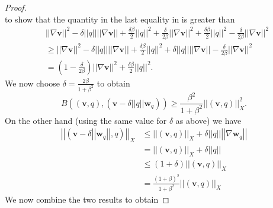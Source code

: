 \documentclass[12pt,a4paper]{article}
\theoremstyle{definition}
\begin{document}
\begin{proof}
\begin{equation}
\end{equation}
to show that the quantity in the last equality in is greater than
\begin{equation}
\begin{aligned}\nonumber
&\left|\left|\nabla \textbf{v}\right|\right|^2 -  \delta\left|\left|q\right|\right|\left|\left|\nabla \textbf{v}\right|\right| +\frac{\delta \beta }{2}\left|\left|q\right|\right|^2 + \frac{\delta}{2\beta}\left|\left|\nabla\textbf{v}\right|\right|^2 +\frac{\delta \beta }{2}\left|\left|q\right|\right|^2 - \frac{\delta}{2\beta}\left|\left|\nabla\textbf{v}\right|\right|^2\\
&\geq \left|\left|\nabla \textbf{v}\right|\right|^2 -  \delta\left|\left|q\right|\right|\left|\left|\nabla \textbf{v}\right|\right| +\frac{\delta \beta }{2}\left|\left|q\right|\right|^2 + \delta\left|\left|q\right|\right|\left|\left|\nabla \textbf{v}\right|\right|- \frac{\delta}{2\beta}\left|\left|\nabla\textbf{v}\right|\right|^2\\
&=\left(1-\frac{\delta}{2\beta}\right)\left|\left|\nabla \textbf{v}\right|\right|^2 +\frac{\delta\beta}{2}\left|\left|q\right|\right|^2.
\end{aligned}
\end{equation}
We now choose $\delta=\frac{2\beta}{1+\beta^2}$ to obtain
\begin{equation}\nonumber
B\left(\left(\textbf{v},q\right),\left(\textbf{v}-\delta\left|\left|q\right|\right|\textbf{w}_q\right)\right)\geq \frac{\beta^2}{1+\beta^2}\left|\left|\left(\textbf{v},q\right)\right|\right|_X^2.
\end{equation}
On the other hand (using the same value for $\delta$ as above) we have
\begin{equation}
\begin{aligned}\nonumber
\left|\left|\left(\textbf{v}-\delta\left|\left|\textbf{w}_q\right|\right|,q\right)\right|\right|_X&\leq \left|\left|\left(\textbf{v},q\right)\right|\right|_X+\delta\left|\left|q\right|\right|\left|\left|\nabla \textbf{w}_q\right|\right|\\
&=\left|\left|\left(\textbf{v},q\right)\right|\right|_X + \delta\left|\left|q\right|\right|\\
&\leq\left(1+\delta\right)\left|\left|\left(\textbf{v},q\right)\right|\right|_X \\
&=\frac{\left(1+\beta\right)^2}{1+\beta^2}\left|\left|\left(\textbf{v},q\right)\right|\right|_X 
\end{aligned}
\end{equation}
We now combine the two results to obtain

\end{proof}
\end{document}
